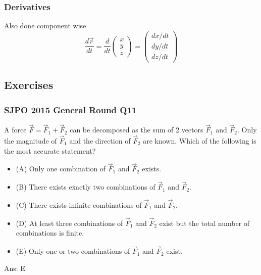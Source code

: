 \documentclass{article}
\begin{document}
\subsubsection{Derivatives}
Also done component wise
$$\frac{d\vec{r}}{dt} = \frac{d}{dt}\left(
    \begin{array}{c}  
         x \\
         y \\
         z
    \end{array} 
    \right) = \left(
    \begin{array}{c}  
         dx/dt \\
         dy/dt \\
         dz/dt
    \end{array} 
    \right)
$$

\subsection{Exercises}
\begin{samepage}
\subsubsection{SJPO 2015 General Round Q11}
A force $\vec{F} = \vec{F}_1 + \vec{F}_2$ can be decomposed as the sum of 2 vectors $\vec{F}_1$ and $\vec{F}_2$. Only the magnitude of $\vec{F}_1$ and the direction of $\vec{F}_2$ are known. Which of the following is the most accurate statement?
\begin{itemize}
\item[](A) Only one combination of $\vec{F}_1$ and $\vec{F}_2$ exists.
\item[](B) There exists exactly two combinations of $\vec{F}_1$ and $\vec{F}_2$.
\item[](C) There exists infinite combinations of $\vec{F}_1$ and $\vec{F}_2$.
\item[](D) At least three combinations of $\vec{F}_1$ and $\vec{F}_2$ exist but the total number of combinations is finite.
\item[](E) Only one or two combinations of $\vec{F}_1$ and $\vec{F}_2$ exist.
\end{itemize}
Ans: \ifpaper E \fi
\end{samepage}
\end{document}
